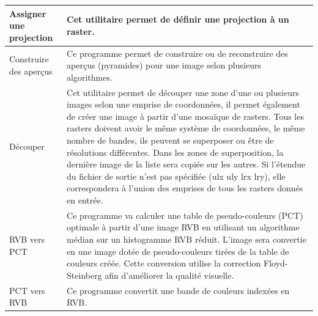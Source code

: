 {\begin{longtable}{|p{3cm}|p{13cm}|}
\hline Assigner une projection & Cet utilitaire permet de définir une projection à un raster. \\
\hline Construire des aperçus & Ce programme permet de construire ou de reconstruire des aperçus (pyramides) pour une image selon plusieurs algorithmes.\\
\hline Découper & Cet utilitaire permet de découper une zone d'une ou plusieurs images selon une emprise de coordonnées, il permet également de créer une image à partir d'une mosaïque de rasters. Tous les rasters doivent avoir le même système de coordonnées, le même nombre de bandes, ils peuvent se superposer ou être de résolutions différentes. Dans les zones de superposition, la dernière image de la liste sera copiée sur les autres. Si l'étendue du fichier de sortie n'est pas spécifiée (ulx uly lrx lry), elle correspondera à l'union des emprises de tous les rasters donnés en entrée. \\
\hline RVB vers PCT & Ce programme va calculer une table de pseudo-couleurs (PCT) optimale à partir d'une image RVB en utilisant un algorithme médian sur un histogramme RVB réduit. L'image sera convertie en une image dotée de pseudo-couleurs tirées de la table de couleurs créée. Cette conversion utilise la correction Floyd-Steinberg afin d'améliorer la qualité visuelle. \\
PCT vers RVB & Ce programme convertit une bande de couleurs indexées en RVB.\\


\end{longtable}}
